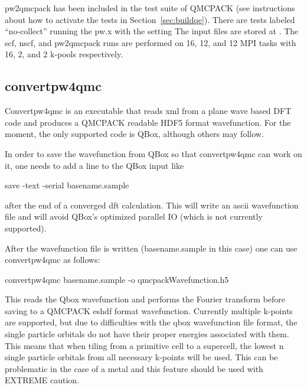 pw2qmcpack has been included in the test suite of QMCPACK (see instructions about how to activate the tests in Section~\ref{sec:buildqe}).
There are tests labeled ``no-collect'' running the pw.x with the setting 
The input files are stored at .
The scf, nscf, and pw2qmcpack runs are performed on 16, 12, and 12 MPI tasks with 16, 2, and 2 k-pools respectively.
\subsection{convertpw4qmc}
Convertpw4qmc is an executable that reads xml from a plane wave based DFT code and produces a QMCPACK readable 
HDF5 format wavefunction.  For the moment, the only supported code is QBox, although others may follow.

In order to save the wavefunction from QBox so that convertpw4qmc can work on it, one needs to add a line to the
QBox input like
\begin{shade}
save -text -serial basename.sample
\end{shade}
after the end of a converged dft calculation.  This will write an ascii wavefunction file and will avoid
QBox's optimized parallel IO (which is not currently supported).

After the wavefunction file is written (basename.sample in this case) one can use convertpw4qmc as follows:
\begin{shade}
convertpw4qmc basename.sample -o qmcpackWavefunction.h5
\end{shade}

This reads the Qbox wavefunction and performs the Fourier transform before saving to a QMCPACK eshdf format wavefunction.  Currently multiple k-points are supported, but due to difficulties with the qbox wavefunction file format, the single particle orbitals do not have their proper energies associated with them.  This means that when tiling from a primitive cell to a supercell, the lowest n single particle orbitals from all necessary k-points will be used.  This can be problematic in the case of a metal and this feature should be used with EXTREME caution.


